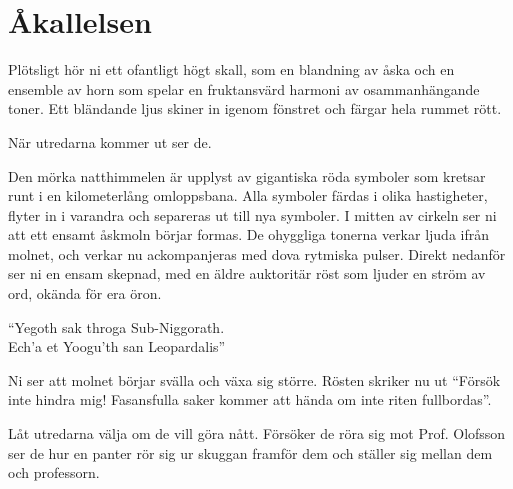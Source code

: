 \section{Åkallelsen}
\label{sek:Akallelsen}
%
\begin{displayquote}
	Plötsligt hör ni ett ofantligt högt skall, som en blandning av åska och en ensemble av horn som spelar en fruktansvärd harmoni av osammanhängande toner. Ett bländande ljus skiner in igenom fönstret och färgar hela rummet rött.
\end{displayquote}
%
När utredarna kommer ut ser de.

\begin{displayquote}
	Den mörka natthimmelen är upplyst av gigantiska röda symboler som kretsar runt i en kilometerlång omloppsbana. Alla symboler färdas i olika hastigheter, flyter in i varandra och separeras ut till nya symboler. I mitten av cirkeln ser ni att ett ensamt åskmoln börjar formas. De ohyggliga tonerna verkar ljuda ifrån molnet, och verkar nu ackompanjeras med dova rytmiska pulser. Direkt nedanför ser ni en ensam skepnad, med en äldre auktoritär röst som ljuder en ström av ord, okända för era öron.
	\begin{center}
		``Yegoth sak throga Sub-Niggorath. \\
		Ech'a et Yoogu'th san Leopardalis''
	\end{center}
	Ni ser att molnet börjar svälla och växa sig större. Rösten skriker nu ut ``Försök inte hindra mig! Fasansfulla saker kommer att hända om inte riten fullbordas''.
\end{displayquote}
%
Låt utredarna välja om de vill göra nått. Försöker de röra sig mot Prof. Olofsson ser de hur en panter rör sig ur skuggan framför dem och ställer sig mellan dem och professorn.

